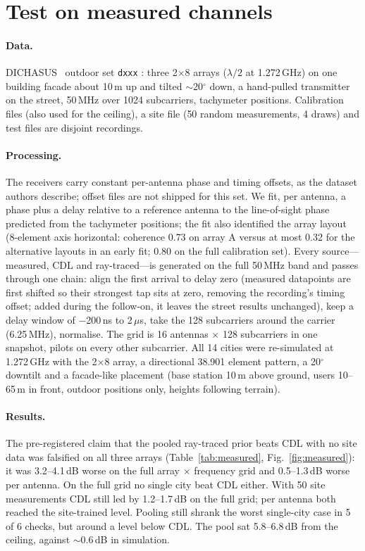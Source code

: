 \documentclass[11pt]{article}
\begin{document}
\section{Test on measured channels}
\label{sec:measured}

\paragraph{Data.} DICHASUS~\cite{dichasus} outdoor set \texttt{dxxx}
\cite{dichasusdata}: three 2$\times$8 arrays ($\lambda/2$ at 1.272\,GHz) on one
building facade about 10\,m up and tilted $\sim$20$^\circ$ down, a hand-pulled
transmitter on the street, 50\,MHz over 1024 subcarriers, tachymeter
positions. Calibration files (also used for the ceiling), a site file (50
random measurements, 4 draws) and test files are disjoint recordings.

\paragraph{Processing.} The receivers carry constant per-antenna phase and
timing offsets, as the dataset authors describe; offset files are not shipped
for this set. We fit, per antenna, a phase plus a delay relative to a reference
antenna to the line-of-sight phase predicted from the tachymeter positions;
the fit also identified the array layout (8-element axis horizontal: coherence
0.73 on array A versus at most 0.32 for the alternative layouts in an early fit;
0.80 on the full calibration set).
Every source---measured, CDL and ray-traced---is generated on the full
50\,MHz band and passes through one chain: align the first arrival to delay
zero (measured datapoints are first shifted so their strongest tap sits at
zero, removing the recording's timing offset; added during the follow-on, it
leaves the street results unchanged), keep a delay window of $-$200\,ns to 2\,$\mu$s, take the 128 subcarriers
around the carrier (6.25\,MHz), normalise. The grid is 16 antennas $\times$ 128
subcarriers in one snapshot, pilots on every other subcarrier. All 14 cities
were re-simulated at 1.272\,GHz with the 2$\times$8 array, a directional
38.901 element pattern, a 20$^\circ$ downtilt and a facade-like placement
(base station 10\,m above ground, users 10--65\,m in front, outdoor positions
only, heights following terrain).

\paragraph{Results.} The pre-registered claim that the pooled ray-traced prior
beats CDL with no site data was falsified on all three arrays
(Table~\ref{tab:measured}, Fig.~\ref{fig:measured}): it was 3.2--4.1\,dB worse
on the full array $\times$ frequency grid and 0.5--1.3\,dB worse per antenna.
On the full grid no single city beat CDL either. With 50 site measurements CDL
still led by 1.2--1.7\,dB on the full grid; per antenna both reached the
site-trained level. Pooling still shrank the worst single-city case in 5 of 6
checks, but around a level below CDL. The pool sat 5.8--6.8\,dB from the
ceiling, against $\sim$0.6\,dB in simulation.
\end{document}
